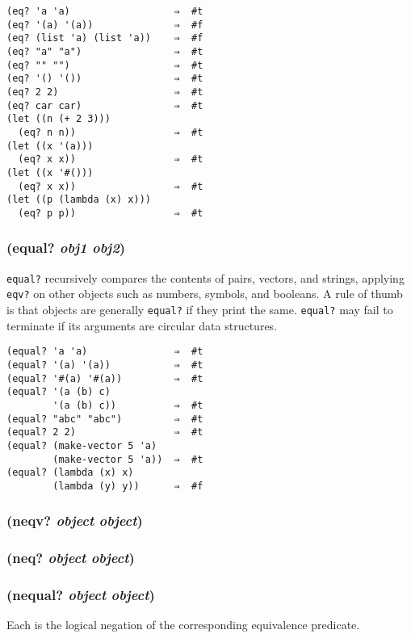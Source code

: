 \documentclass{article}
\begin{document}
\begin{verbatim}
(eq? 'a 'a)                  ⇒  #t
(eq? '(a) '(a))              ⇒  #f
(eq? (list 'a) (list 'a))    ⇒  #f
(eq? "a" "a")                ⇒  #t
(eq? "" "")                  ⇒  #t
(eq? '() '())                ⇒  #t
(eq? 2 2)                    ⇒  #t
(eq? car car)                ⇒  #t
(let ((n (+ 2 3)))
  (eq? n n))                 ⇒  #t
(let ((x '(a)))
  (eq? x x))                 ⇒  #t
(let ((x '#()))
  (eq? x x))                 ⇒  #t
(let ((p (lambda (x) x)))
  (eq? p p))                 ⇒  #t
\end{verbatim}

\subsubsection{(equal? \emph{obj1} \emph{obj2})}

\verb|equal?| recursively compares the contents of pairs, vectors, and strings,
applying \verb|eqv?| on other objects such as numbers, symbols, and booleans. A
rule of thumb is that objects are generally \verb|equal?| if they print the same.
\verb|equal?| may fail to terminate if its arguments are circular data structures.

\begin{verbatim}
(equal? 'a 'a)               ⇒  #t
(equal? '(a) '(a))           ⇒  #t
(equal? '#(a) '#(a))         ⇒  #t
(equal? '(a (b) c)
        '(a (b) c))          ⇒  #t
(equal? "abc" "abc")         ⇒  #t
(equal? 2 2)                 ⇒  #t
(equal? (make-vector 5 'a)
        (make-vector 5 'a))  ⇒  #t
(equal? (lambda (x) x)
        (lambda (y) y))      ⇒  #f
\end{verbatim}

\subsubsection{(neqv? \emph{object} \emph{object})}

\subsubsection{(neq? \emph{object} \emph{object})}

\subsubsection{(nequal? \emph{object} \emph{object})}

Each is the logical negation of the corresponding equivalence predicate.
\end{document}
